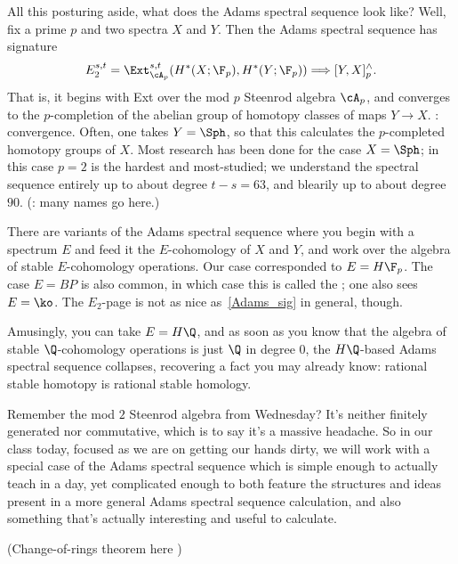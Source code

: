 All this posturing aside, what does the Adams spectral sequence look like? Well, fix a prime $p$ and two spectra
$X$ and $Y$. Then the Adams spectral sequence has signature
\begin{equation}
\label{Adams_sig}
	E_2^{s,t} = \Ext_{\cA_p}^{s,t}(H^*(X;\F_p), H^*(Y; \F_p)) \Longrightarrow [Y, X]_p^\wedge.
\end{equation}
That is, it begins with Ext over the mod $p$ Steenrod algebra $\cA_p$, and converges to the $p$-completion of the
abelian group of homotopy classes of maps $Y\to X$. \TODO: convergence. Often, one takes $Y = \Sph$, so that this
calculates the $p$-completed homotopy groups of $X$. Most research has been done for the case $X = \Sph$; in this
case $p = 2$ is the hardest and most-studied; we understand the spectral sequence entirely up to about degree $t -
s = 63$, and blearily up to about degree $90$. (\TODO: many names go here.)
\begin{rem}
There are variants of the Adams spectral sequence where you begin with a spectrum $E$ and feed it the
$E$-cohomology of $X$ and $Y$, and work over the algebra of stable $E$-cohomology operations. Our case corresponded
to $E = H\F_p$. The case $E = \mathit{BP}$ is also common, in which case this is called the ; one also sees $E = \ko$. The $E_2$-page is not as nice as~\eqref{Adams_sig} in general, though.

Amusingly, you can take $E = H\Q$, and as soon as you know that the algebra of stable $\Q$-cohomology operations is
just $\Q$ in degree $0$, the $H\Q$-based Adams spectral sequence collapses, recovering a fact you may already know:
rational stable homotopy is rational stable homology.
\end{rem}
Remember the mod $2$ Steenrod algebra from Wednesday? It's neither finitely generated nor commutative, which is to
say it's a massive headache. So in our class today, focused as we are on getting our hands dirty, we will work with
a special case of the Adams spectral sequence which is simple enough to actually teach in a day, yet complicated
enough to both feature the structures and ideas present in a more general Adams spectral sequence calculation, and
also something that's actually interesting and useful to calculate.

(Change-of-rings theorem here \TODO)

